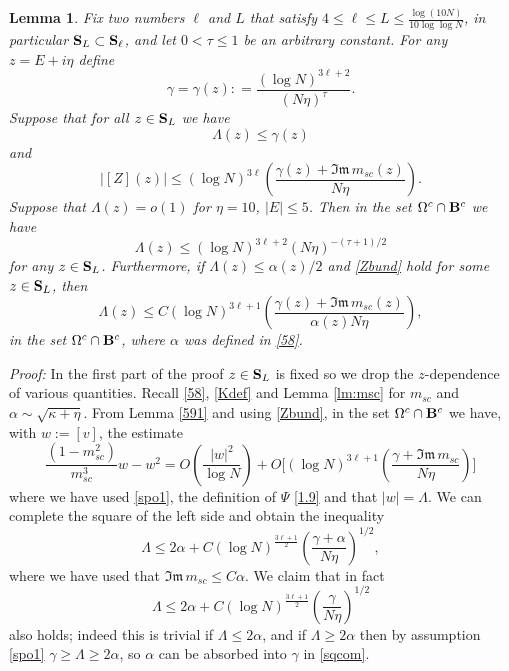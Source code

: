 \documentclass[draft]{article}
\newcommand{\al}{\alpha}
\newcommand{\be}{\begin{equation}}
\newcommand{\ee}{\end{equation}}
\newcommand{\im}{{\mathfrak{Im} \, }}
\newcommand{\bS}{ {\bf  S}}
\newtheorem{lemma}[theorem]{Lemma}
\numberwithin{equation}{section}
\numberwithin{theorem}{section}
\numberwithin{definition}{section}
\numberwithin{remark}{section}
\begin{document}
\bigskip



\begin{lemma}\label{selfKK}  Fix two numbers $\ell$ and $L$
 that satisfy $4\le \ell \le L\le\frac{\log (10 N)}{10\log\log N}$, in
particular $\bS_L\subset\bS_\ell$,
and let $0< \tau\le 1$ be an arbitrary constant.
For any $z=E+i\eta$ define
\be
  \gamma = \gamma(z): =  \frac{(\log N)^{3\ell+2}}{(N\eta)^\tau}.
\label{gammadef}
\ee
Suppose that  for all $z\in {\bf S}_L$ we have 
\be\label{spo1}
 \Lambda (z) \leq  \gamma(z) 
\ee
and 
\be\label{Zbund}
|[Z](z)|\leq (\log N)^{3 \ell}\left(\frac{\gamma(z) +\im m_{sc}(z) }{N\eta}\right).
\ee
Suppose that  $\Lambda(z)= o(1)$ for $\eta=10$, $|E|\le 5$.
 Then  in the set $\Omega^c \cap {\bf B}^c$ we have 
\be\label{spo2}
\Lambda(z)\leq (\log N)^{3 \ell  +2}(N\eta)^{-(\tau+ 1)/2}
\ee
for any $z\in {\bf S}_L$.
Furthermore, if $\Lambda(z)\leq \al(z)/2$ and \eqref{Zbund} hold
for some $z\in{\bf S}_L$, then 
\be\label{spo3}
\Lambda(z) \leq   C(\log N)^{3 \ell+1}\left(\frac{\gamma(z)+\im m_{sc}(z) }{\al(z) N\eta}\right),
\ee
in the set $\Omega^c \cap {\bf B}^c$,
where $\alpha$ was defined in \eqref{58}. 
\end{lemma}



{\it Proof:} 
In the first part of the proof $z\in \bS_L$ is fixed
so we drop the $z$-dependence of various quantities. 
Recall  \eqref{58}, \eqref{Kdef} and Lemma \ref{lm:msc} for $m_{sc}$ 
and $\alpha  \sim \sqrt {\kappa + \eta}$.  
From  Lemma \ref{591} and using \eqref{Zbund},    in the set $\Omega^c \cap {\bf B}^c$ we have, 
  with $w:= [v]$, the estimate 
\be\label{115}
\frac{(1-m_{sc}^2)}{m_{sc}^3}w -w^2=O\left(\frac{|w|^2}{\log N}\right)+O\Big [( \log N)^{3 \ell+1}
\left(\frac{\gamma+\im m_{sc} }{N\eta}\right)\Big ] 
\ee 
where we have used \eqref{spo1}, the definition
of $\Psi$ \eqref{1.9} and that $|w| = \Lambda$.  We can complete the square of the left side 
and obtain the inequality 
\be
\Lambda\leq 2\al +C(\log N)^{ \frac{3\ell+1}{2}}\left(\frac{\gamma+ \alpha }{N\eta}\right)^{1/2},
\label{sqcom}
\ee
where we have used that $\im m_{sc} \le C  \alpha$.  
We claim that in fact
\be\label{120}
\Lambda\leq 2\al +C(\log N)^{ \frac{3 \ell+1}{2}}\left(\frac{\gamma}{N\eta}\right)^{1/2}
\ee 
also holds; indeed this is trivial if $\Lambda\le 2\al$, and 
if $\Lambda\geq 2\al$ then by assumption 
\eqref{spo1}
$\gamma\ge \Lambda \ge 2 \alpha$, so $\al$ can be absorbed into $\gamma$
in \eqref{sqcom}.
\end{document}

